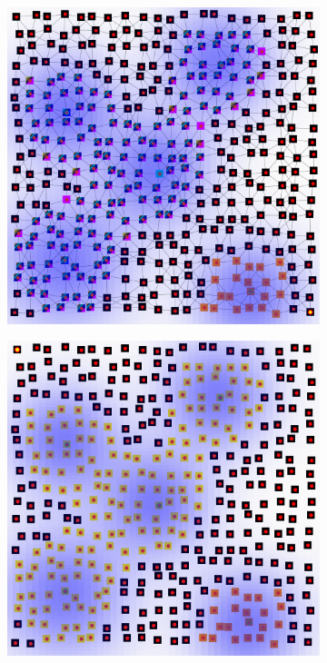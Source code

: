 \begin{figure}[t]
  \begin{subfigure}[b]{0.45\textwidth}
    \centering
    \includegraphics[width=\textwidth]{papers/swarm-intelligence2021/img/simulation-execution.png}
  \end{subfigure}
  \begin{subfigure}[b]{0.45\textwidth}
    \centering
    \includegraphics[width=\textwidth]{papers/swarm-intelligence2021/img/after-merge.png}

\end{subfigure}
\end{figure}
